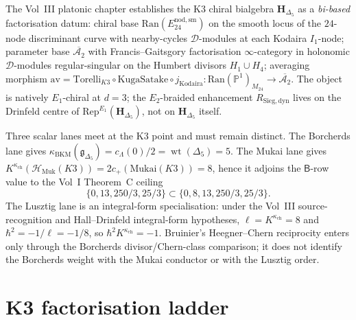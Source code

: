 \begin{remark}[Bi-based Ran-space for $K3\times E$ at $d=3$]
\label{rem:enkd-bi-based-ran}
The Vol~III platonic chapter establishes the K3 chiral bialgebra $\mathbf{H}_{\Delta_5}$ as a \emph{bi-based} factorisation datum: chiral base $\mathrm{Ran}(E^{\mathrm{nod,sm}}_{24})$ on the smooth locus of the $24$-node discriminant curve with nearby-cycles $\mathcal{D}$-modules at each Kodaira $I_1$-node; parameter base $\overline{\mathcal{A}_2}$ with Francis--Gaitsgory factorisation $\infty$-category in holonomic $\mathcal{D}$-modules regular-singular on the Humbert divisors $H_1 \cup H_4$; averaging morphism $\mathrm{av} = \mathrm{Torelli}_{K3} \circ \mathrm{KugaSatake} \circ j_{\mathrm{Kodaira}} \colon \mathrm{Ran}(\mathbb{P}^1)_{M_{24}} \to \overline{\mathcal{A}_2}$. The object is natively $E_1$-chiral at $d = 3$; the $E_2$-braided enhancement $R_{\mathrm{Sieg,dyn}}$ lives on the Drinfeld centre of $\mathrm{Rep}^{E_1}(\mathbf{H}_{\Delta_5})$, not on $\mathbf{H}_{\Delta_5}$ itself.
\end{remark}

\begin{remark}[Universal $\Phi$-trace identity and $K^{\kappa_{\mathrm{ch}}}=8$]
\label{rem:enkd-phi-trace}
Three scalar lanes meet at the K3 point and must remain distinct. The
Borcherds lane gives
$\kappa_{\mathrm{BKM}}(\mathfrak g_{\Delta_5})=c_\Lambda(0)/2
=\operatorname{wt}(\Delta_5)=5$. The Mukai lane gives
$K^{\kappa_{\mathrm{ch}}}(\mathcal H_{\mathrm{Muk}}(K3))
=2c_+(\mathrm{Mukai}(K3))=8$, hence it adjoins the
$\mathsf B$-row value to the Vol~I Theorem~C ceiling
\[
  \{0,13,250/3,25/3\}\subset
  \{0,8,13,250/3,25/3\}.
\]
The Lusztig lane is an integral-form specialisation: under the
Vol~III source-recognition and Hall--Drinfeld integral-form
hypotheses, $\ell=K^{\kappa_{\mathrm{ch}}}=8$ and
$\hbar^2=-1/\ell=-1/8$, so
$\hbar^2K^{\kappa_{\mathrm{ch}}}=-1$. Bruinier's Heegner--Chern
reciprocity enters only through the Borcherds divisor/Chern-class
comparison; it does not identify the Borcherds weight with the Mukai
conductor or with the Lusztig order.
\end{remark}

\section{K3 factorisation ladder}
\label{sec:enkd-deep}

